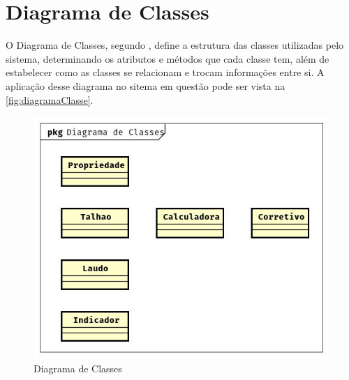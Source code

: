 \section{Diagrama de Classes}
\label{sec:titSecDiagClasse}

O Diagrama de Classes, segundo \cite{guedes2018uml}, define a estrutura das classes utilizadas pelo sistema, determinando os atributos e métodos que cada classe tem, além de estabelecer como as classes se relacionam e trocam informações entre si. A aplicação desse diagrama no sitema em questão pode ser vista na \autoref{fig:diagramaClasse}.

\begin{figure}[H]
    \centering
    \includegraphics[width=13cm]{./dados/analise/diagramaclasse.jpg}
    \caption{Diagrama de Classes}
    \label{fig:diagramaClasse}
\end{figure}